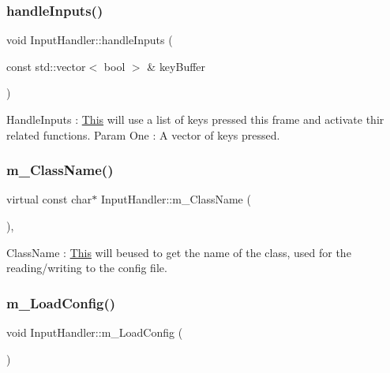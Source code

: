 \subsubsection{\texorpdfstring{handle\+Inputs()}{handleInputs()}}
{\footnotesize\ttfamily void Input\+Handler\+::handle\+Inputs (\begin{DoxyParamCaption}\item[{const std\+::vector$<$ bool $>$ \&}]{key\+Buffer }\end{DoxyParamCaption})\hspace{0.3cm}{\ttfamily [inline]}}

Handle\+Inputs \+: \mbox{\hyperlink{class_this}{This}} will use a list of keys pressed this frame and activate thir related functions. Param One \+: A vector of keys pressed. \mbox{\label{struct_input_handler_a4e77e8e4824b8287ae3a5d1af732677f}} 
\subsubsection{\texorpdfstring{m\+\_\+\+Class\+Name()}{m\_ClassName()}}
{\footnotesize\ttfamily virtual const char$\ast$ Input\+Handler\+::m\+\_\+\+Class\+Name (\begin{DoxyParamCaption}{ }\end{DoxyParamCaption})\hspace{0.3cm}{\ttfamily [inline]}, {\ttfamily [virtual]}}

Class\+Name \+: \mbox{\hyperlink{class_this}{This}} will beused to get the name of the class, used for the reading/writing to the config file. \mbox{\label{struct_input_handler_ae8150d9263151be0d480a382f2c16b02}} 
\subsubsection{\texorpdfstring{m\+\_\+\+Load\+Config()}{m\_LoadConfig()}}
{\footnotesize\ttfamily void Input\+Handler\+::m\+\_\+\+Load\+Config (\begin{DoxyParamCaption}{ }\end{DoxyParamCaption})\hspace{0.3cm}{\ttfamily [inline]}}

